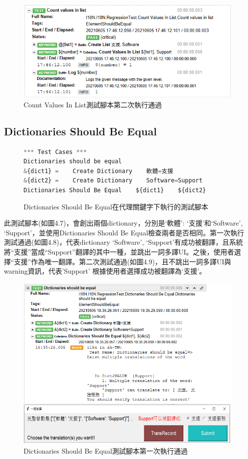 \begin{figure}[H]
\includegraphics[width= \textwidth]{../論文截圖/4.1.2-3 count values in list 2nd run.png}
\caption{Count Values In List測試腳本第二次執行通過}
\end{figure}

\subsection{Dictionaries Should Be Equal}
\begin{figure}[H]
\begin{lstlisting}[language={python}]
*** Test Cases ***
Dictionaries should be equal
&{dict1} =    Create Dictionary    軟體=支援
&{dict2} =    Create Dictionary    Software=Support
Dictionaries Should Be Equal    ${dict1}    ${dict2}
\end{lstlisting}
\caption{Dictionaries Should Be Equal在代理關鍵字下執行的測試腳本}
\end{figure}
此測試腳本(如圖4.7)，會創出兩個dictionary，分別是{‘軟體’: ‘支援’}和{‘Software’, ‘Support’}，並使用Dictionaries Should Be Equal檢查兩者是否相同。第一次執行測試通過(如圖4.8)，代表dictionary {‘Software’, ‘Support’}有成功被翻譯，且系統將“支援”當成“Support”翻譯的其中一種，並跳出一詞多譯UI。之後，使用者選擇“支援”作為唯一翻譯。第二次測試通過(如圖4.9)，且不跳出一詞多譯UI與warning資訊，代表’Support’ 根據使用者選擇成功被翻譯為‘支援’。

\begin{figure}[H]
\includegraphics[width= \textwidth]{../論文截圖/4.1.3-2 dictionaries should be equal 1st run.png}
\caption{Dictionaries Should Be Equal測試腳本第一次執行通過}
\end{figure}

